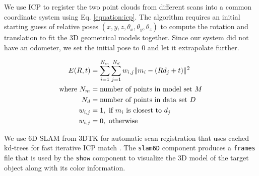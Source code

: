 We use \ac{ICP} \cite{besl:1992} to register the two point clouds from
different scans into a common coordinate system using Eq. \ref{equation:icp}.
The algorithm requires an initial starting guess of relative poses $(x, y, z,
\theta_x, \theta_y, \theta_z)$ to compute the rotation and translation to fit
the 3D geometrical models together. Since our system did not have an odometer,
we set the initial pose to 0 and let it extrapolate further.

\begin{align}
	\label{equation:icp}
	E(R, t) &= \sum_{i=1}^{N_m} \sum_{j=1}^{N_d} w_{i,j}\| m_i - (Rd_j + t) \|^2 \notag \\
	\text{where}~ N_m &= \text{number of points in model set}~ M \notag \\
						N_d &= \text{number of points in data set}~ D \notag \\
						w_{i,j} &= 1, ~\text{if}~ m_i~ \text{is closest to}~	d_j \notag \\
						w_{i,j} &= 0, ~\text{otherwise}
\end{align}

We use 6D \ac{SLAM} from \ac{3DTK} \cite{3dtk:2012} for automatic scan
registration that uses cached kd-trees for fast iterative \ac{ICP} match
\cite{nuchter:2007}. The \texttt{slam6D} component produces a \texttt{frames}
file that is used by the \texttt{show} component to visualize the 3D model of
the target object along with its color information.
